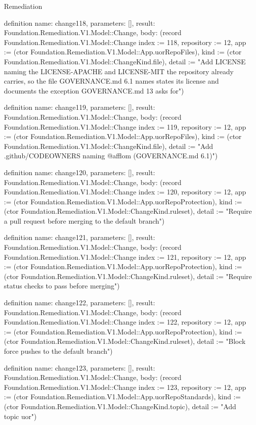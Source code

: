 \begin{lexlean}{Remediation}
\begin{semanticmodule}
definition{
  name: change118,
  parameters: [],
  result: Foundation.Remediation.V1.Model::Change,
  body: (record Foundation.Remediation.V1.Model::Change {index := 118, repository := 12, app := (ctor Foundation.Remediation.V1.Model::App.uorRepoFiles), kind := (ctor Foundation.Remediation.V1.Model::ChangeKind.file), detail := "Add LICENSE naming the LICENSE-APACHE and LICENSE-MIT the repository already carries, so the file GOVERNANCE.md 6.1 names states its license and documents the exception GOVERNANCE.md 13 asks for"})
}

definition{
  name: change119,
  parameters: [],
  result: Foundation.Remediation.V1.Model::Change,
  body: (record Foundation.Remediation.V1.Model::Change {index := 119, repository := 12, app := (ctor Foundation.Remediation.V1.Model::App.uorRepoFiles), kind := (ctor Foundation.Remediation.V1.Model::ChangeKind.file), detail := "Add .github/CODEOWNERS naming @afflom (GOVERNANCE.md 6.1)"})
}

definition{
  name: change120,
  parameters: [],
  result: Foundation.Remediation.V1.Model::Change,
  body: (record Foundation.Remediation.V1.Model::Change {index := 120, repository := 12, app := (ctor Foundation.Remediation.V1.Model::App.uorRepoProtection), kind := (ctor Foundation.Remediation.V1.Model::ChangeKind.ruleset), detail := "Require a pull request before merging to the default branch"})
}

definition{
  name: change121,
  parameters: [],
  result: Foundation.Remediation.V1.Model::Change,
  body: (record Foundation.Remediation.V1.Model::Change {index := 121, repository := 12, app := (ctor Foundation.Remediation.V1.Model::App.uorRepoProtection), kind := (ctor Foundation.Remediation.V1.Model::ChangeKind.ruleset), detail := "Require status checks to pass before merging"})
}

definition{
  name: change122,
  parameters: [],
  result: Foundation.Remediation.V1.Model::Change,
  body: (record Foundation.Remediation.V1.Model::Change {index := 122, repository := 12, app := (ctor Foundation.Remediation.V1.Model::App.uorRepoProtection), kind := (ctor Foundation.Remediation.V1.Model::ChangeKind.ruleset), detail := "Block force pushes to the default branch"})
}

definition{
  name: change123,
  parameters: [],
  result: Foundation.Remediation.V1.Model::Change,
  body: (record Foundation.Remediation.V1.Model::Change {index := 123, repository := 12, app := (ctor Foundation.Remediation.V1.Model::App.uorRepoStandards), kind := (ctor Foundation.Remediation.V1.Model::ChangeKind.topic), detail := "Add topic uor"})
}


\end{semanticmodule}
\end{lexlean}
